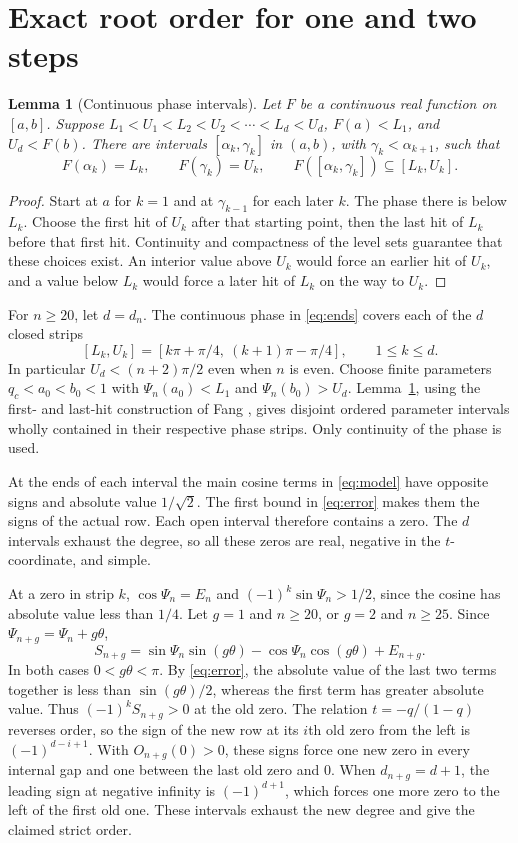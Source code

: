 \documentclass[11pt]{article}
\newtheorem{lemma}[theorem]{Lemma}
\begin{document}
\section{Exact root order for one and two steps}

\begin{lemma}[Continuous phase intervals]\label{lem:phase}
Let \(F\) be a continuous real function on \([a,b]\). Suppose
\(L_1<U_1<L_2<U_2<\cdots<L_d<U_d\), \(F(a)<L_1\), and \(U_d<F(b)\).
There are intervals \([\alpha_k,\gamma_k]\) in \((a,b)\), with
\(\gamma_k<\alpha_{k+1}\), such that
\[
 F(\alpha_k)=L_k,\qquad F(\gamma_k)=U_k,\qquad
 F([\alpha_k,\gamma_k])\subseteq[L_k,U_k].
\]
\end{lemma}
\begin{proof}
Start at \(a\) for \(k=1\) and at \(\gamma_{k-1}\) for each later \(k\).
The phase there is below \(L_k\). Choose the first hit of \(U_k\)
after that starting point, then the last hit of \(L_k\) before that
first hit. Continuity and compactness of the level sets guarantee
that these choices exist. An interior value above \(U_k\) would
force an earlier hit of \(U_k\), and a value below \(L_k\) would
force a later hit of \(L_k\) on the way to \(U_k\).
\end{proof}

For \(n\ge20\), let \(d=d_n\). The continuous phase in \eqref{eq:ends} covers each of the \(d\) closed strips
\[
 [L_k,U_k]=[k\pi+\pi/4,\ (k+1)\pi-\pi/4],\qquad 1\le k\le d.
\]
In particular \(U_d<(n+2)\pi/2\) even when \(n\) is even. Choose finite parameters \(q_c<a_0<b_0<1\) with \(\Psi_n(a_0)<L_1\) and \(\Psi_n(b_0)>U_d\).
Lemma~\ref{lem:phase}, using the first- and last-hit construction of Fang
\cite[Section~6]{fang}, gives disjoint ordered parameter intervals wholly
contained in their respective phase strips. Only continuity of the phase is used.

At the ends of each interval the main cosine terms in \eqref{eq:model} have opposite signs and absolute value \(1/\sqrt2\). The first bound in \eqref{eq:error} makes them the signs of the actual row. Each open interval therefore contains a zero. The \(d\) intervals exhaust the degree, so all these zeros are real, negative in the \(t\)-coordinate, and simple.

At a zero in strip \(k\), \(\cos\Psi_n=E_n\) and \((-1)^k\sin\Psi_n>1/2\), since the cosine has absolute value less than \(1/4\). Let \(g=1\) and \(n\ge20\), or \(g=2\) and \(n\ge25\).
Since \(\Psi_{n+g}=\Psi_n+g\theta\),
\[
 S_{n+g}
  = \sin\Psi_n\sin(g\theta)-\cos\Psi_n\cos(g\theta)+E_{n+g}.
\]
In both cases \(0<g\theta<\pi\). By \eqref{eq:error},
the absolute value of the last two terms together is less than
\(\sin(g\theta)/2\), whereas the first term has greater absolute value.
Thus \((-1)^k S_{n+g}>0\) at the old zero.
The relation \(t=-q/(1-q)\) reverses order, so the sign of the new row
at its \(i\)th old zero from the left is \((-1)^{d-i+1}\).
With \(O_{n+g}(0)>0\), these signs force one new zero in every
internal gap and one between the last old zero and 0. When
\(d_{n+g}=d+1\), the leading sign at negative infinity is
\((-1)^{d+1}\), which forces one more zero to the left of the first old one.
These intervals exhaust the new degree and give the claimed strict order.
\end{document}
